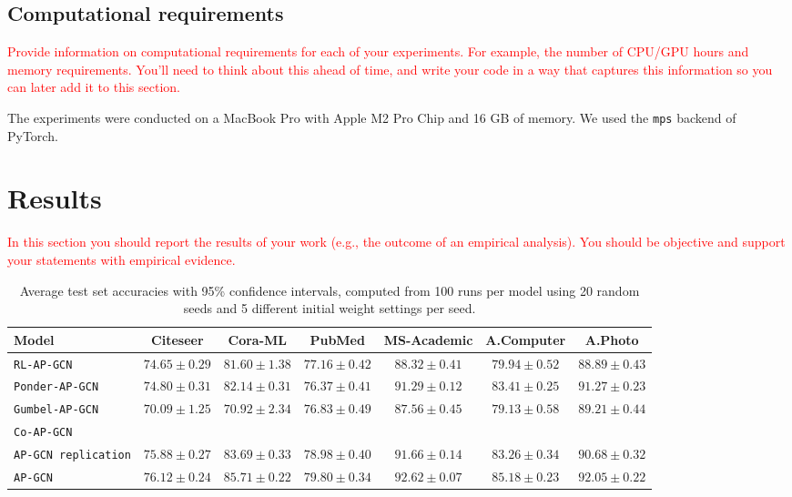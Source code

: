 \documentclass{gdl}
\begin{document}
\subsection{Computational requirements}
\textcolor{red}{Provide information on computational requirements for each of your experiments. For example, the number of CPU/GPU hours and memory requirements. You'll need to think about this ahead of time, and write your code in a way that captures this information so you can later add it to this section. }

The experiments were conducted on a MacBook Pro with Apple M2 Pro Chip and 16 GB of memory. We used the \texttt{mps} backend of PyTorch.


\section{Results}

\textcolor{red}{In this section you should report the results of your work (e.g., the outcome of an empirical analysis). You should be objective and support your statements with empirical evidence.}

\begin{table}[h]
    \small\sf\centering
    \caption{Average test set accuracies with 95\% confidence intervals, computed from 100 runs per model using 20 random seeds and 5 different initial weight settings per seed.}
    \begin{tabular}{l c c c c c c}
        \toprule
        Model & Citeseer & Cora-ML & PubMed & MS-Academic & A.Computer & A.Photo\\
        \midrule
        \texttt{RL-AP-GCN} &$74.65 \pm 0.29$&$81.60 \pm 1.38$&$77.16 \pm 0.42$&$88.32 \pm 0.41$&$79.94 \pm 0.52$&$88.89 \pm 0.43$ \\
        \texttt{Ponder-AP-GCN} &$74.80 \pm 0.31$&$82.14 \pm 0.31$&$76.37 \pm 0.41$&$91.29 \pm 0.12$&$83.41 \pm 0.25$&$91.27 \pm 0.23$ \\
        \texttt{Gumbel-AP-GCN} &$70.09 \pm 1.25$&$70.92 \pm 2.34$&$76.83 \pm 0.49$&$87.56 \pm 0.45$&$79.13 \pm 0.58$&$89.21 \pm 0.44$ \\
        \texttt{Co-AP-GCN}  \\
        \texttt{AP-GCN replication} &$75.88 \pm 0.27$&$83.69 \pm 0.33$&$78.98 \pm 0.40$&$91.66 \pm 0.14$&$83.26 \pm 0.34$&$90.68 \pm 0.32$\\
        \midrule
        \texttt{AP-GCN} & $76.12 \pm 0.24$ & $85.71 \pm 0.22$ & $79.80 \pm 0.34$ & $92.62 \pm 0.07$ & $85.18 \pm 0.23$ & $92.05 \pm 0.22$\\
        \bottomrule
    \end{tabular}
    \label{tab:table}
\end{table}
\end{document}
